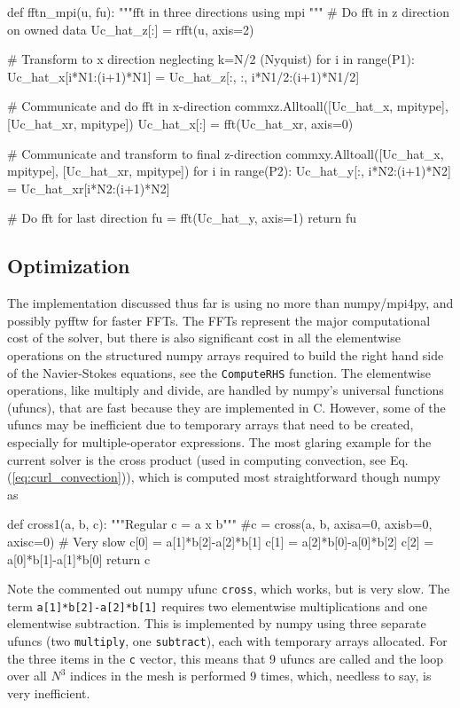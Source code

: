\documentclass[11pt, oneside]{article}
\newcommand{\inpyth}{\lstinline[style=pythonstyle, basicstyle=\ttfamily]} %[]%
\begin{document}
\begin{python}
def fftn_mpi(u, fu):
    """fft in three directions using mpi
    """    
    # Do fft in z direction on owned data
    Uc_hat_z[:] = rfft(u, axis=2)
    
    # Transform to x direction neglecting k=N/2 (Nyquist)
    for i in range(P1):
        Uc_hat_x[i*N1:(i+1)*N1] = Uc_hat_z[:, :, i*N1/2:(i+1)*N1/2]
    
    # Communicate and do fft in x-direction
    commxz.Alltoall([Uc_hat_x, mpitype], [Uc_hat_xr, mpitype])
    Uc_hat_x[:] = fft(Uc_hat_xr, axis=0)        
    
    # Communicate and transform to final z-direction
    commxy.Alltoall([Uc_hat_x, mpitype], [Uc_hat_xr, mpitype])    
    for i in range(P2): 
        Uc_hat_y[:, i*N2:(i+1)*N2] = Uc_hat_xr[i*N2:(i+1)*N2]
                                   
    # Do fft for last direction 
    fu = fft(Uc_hat_y, axis=1)
    return fu
\end{python}

\subsection{Optimization}
The implementation discussed thus far is using no more than numpy/mpi4py, and possibly pyfftw for faster FFTs. The FFTs represent the major computational cost of the solver, but there is also significant cost in all the elementwise operations on the structured numpy arrays required to build the right hand side of the Navier-Stokes equations, see the \inpyth{ComputeRHS} function. The elementwise operations, like multiply and divide, are handled by numpy's universal functions (ufuncs), that are fast because they are implemented in C. However, some of the ufuncs may be inefficient due to temporary arrays that need to be created, especially for multiple-operator expressions. The most glaring example for the current solver is the cross product (used in computing convection, see Eq. (\ref{eq:curl_convection})), which is computed most straightforward though numpy as
\begin{python}
def cross1(a, b, c):
    """Regular c = a x b"""
    #c = cross(a, b, axisa=0, axisb=0, axisc=0) # Very slow
    c[0] = a[1]*b[2]-a[2]*b[1]
    c[1] = a[2]*b[0]-a[0]*b[2]
    c[2] = a[0]*b[1]-a[1]*b[0]
    return c
\end{python}
Note the commented out numpy ufunc \inpyth{cross}, which works, but is very slow. The term \inpyth{a[1]*b[2]-a[2]*b[1]} requires two elementwise multiplications and one elementwise subtraction. This is implemented by numpy using three separate ufuncs (two \inpyth{multiply}, one \inpyth{subtract}), each with temporary arrays allocated. For the three items in the \inpyth{c} vector, this means that 9 ufuncs are called and the loop over all $N^3$ indices in the mesh is performed 9 times, which, needless to say, is very inefficient.
\end{document}
